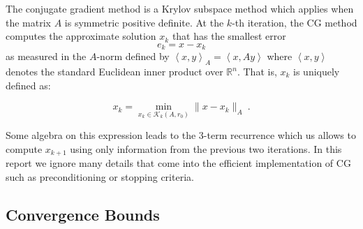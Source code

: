 \documentclass[10pt,a4paper]{article}
\def\<{\left\langle}
\def\>{\right\rangle}
\begin{document}
The conjugate gradient method is a Krylov subspace method which applies when the matrix $A$ is symmetric positive definite. At the $k$-th iteration, the CG method computes the approximate solution $x_k$ that has the smallest error
\begin{equation}
e_k = x- x_k 
\end{equation}
 as measured in the $A$-norm defined by $\< x, y \>_A = \< x, Ay \>$ where $\< x,y\>$ denotes the standard Euclidean inner product over $\mathbb{R}^n$. That is, $x_k$ is uniquely defined as:
 
 \begin{equation}
 x_k = \min_{x_k\in \mathcal{K}_k(A,r_0)} \| x - x_k \|_A \ .
 \end{equation}

Some algebra on this expression leads to the 3-term recurrence which us allows to compute $x_{k+1}$ using only information from the previous two iterations. In this report we ignore many details that come into the efficient implementation of CG such as preconditioning or stopping criteria.

\subsection{Convergence Bounds}
\end{document}
